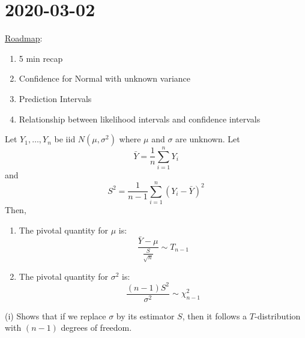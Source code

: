 \section{2020-03-02}
\underline{Roadmap}:
\begin{enumerate}[label=(\roman*)]
    \item 5 min recap
    \item Confidence for Normal with unknown variance
    \item Prediction Intervals
    \item Relationship between likelihood intervals and confidence intervals
\end{enumerate}


\begin{Theorem}{}{}
    Let $ Y_1,\ldots ,Y_n $ be iid $ N(\mu,\sigma^2) $ where $ \mu $ and $ \sigma $ are
    unknown. Let
    \[ \bar{Y}=\frac{1}{n} \sum\limits_{i=1}^{n} Y_i \]
    and
    \[ S^2=\frac{1}{n-1} \sum\limits_{i=1}^{n} (Y_i-\bar{Y})^2 \]
    Then,
    \begin{enumerate}[label=(\roman*)]
        \item The pivotal quantity for $ \mu $ is:
              \[ \frac{\bar{Y}-\mu}{\frac{S}{\sqrt{n}}} \sim T_{n-1}  \]
        \item The pivotal quantity for $ \sigma^2 $ is:
              \[ \frac{(n-1)S^2}{\sigma^2} \sim \chi^2_{n-1}  \]
    \end{enumerate}
\end{Theorem}

\begin{Remark}{}{}
    (i) Shows that if we replace $ \sigma $ by its estimator $ S $, then it follows a $ T $-distribution
    with $ (n-1) $ degrees of freedom.
\end{Remark}


